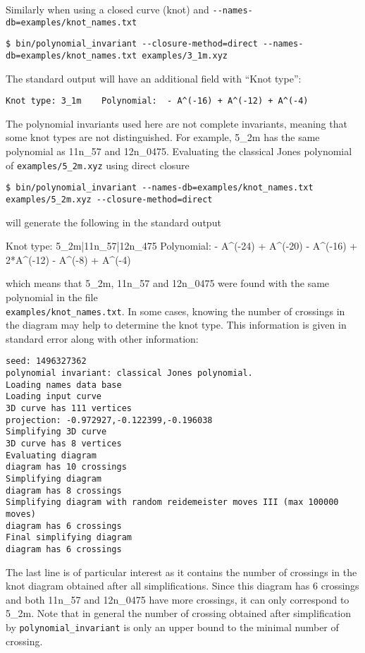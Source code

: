 Similarly when using a closed curve (knot) and \lstinline{--names-db=examples/knot_names.txt}
\begin{lstlisting}
$ bin/polynomial_invariant --closure-method=direct --names-db=examples/knot_names.txt examples/3_1m.xyz
\end{lstlisting}
The standard output will have an additional field with ``Knot type'':
\begin{lstlisting}
Knot type: 3_1m    Polynomial:  - A^(-16) + A^(-12) + A^(-4)
\end{lstlisting}


The polynomial invariants used here are not complete invariants, meaning that some knot types are not distinguished. For example, 5\_2m has the same polynomial as 11n\_57 and 12n\_0475. Evaluating the classical Jones polynomial of \lstinline{examples/5_2m.xyz} using direct closure 
\begin{lstlisting}
$ bin/polynomial_invariant --names-db=examples/knot_names.txt examples/5_2m.xyz --closure-method=direct
\end{lstlisting}
will generate the following in the standard output
\begin{lstlistingsmall}
Knot type: 5_2m|11n_57|12n_475  Polynomial:  - A^(-24) + A^(-20) - A^(-16) + 2*A^(-12) - A^(-8) + A^(-4)
\end{lstlistingsmall}
which means that 5\_2m, 11n\_57 and 12n\_0475 were found with the same polynomial in the file\\
\lstinline{examples/knot_names.txt}. In some cases, knowing the number of crossings in the diagram may help to determine the knot type. This information is given in standard error along with other information:
\begin{lstlisting}
seed: 1496327362
polynomial invariant: classical Jones polynomial.
Loading names data base
Loading input curve
3D curve has 111 vertices
projection: -0.972927,-0.122399,-0.196038
Simplifying 3D curve
3D curve has 8 vertices
Evaluating diagram
diagram has 10 crossings
Simplifying diagram
diagram has 8 crossings
Simplifying diagram with random reidemeister moves III (max 100000 moves)
diagram has 6 crossings
Final simplifying diagram
diagram has 6 crossings
\end{lstlisting}
The last line is of particular interest as it contains the number of crossings in the knot diagram obtained after all simplifications. Since this diagram has 6 crossings and both 11n\_57 and 12n\_0475 have more crossings, it can only correspond to 5\_2m. Note that in general the number of crossing obtained after simplification by \lstinline{polynomial_invariant} is only an upper bound to the minimal number of crossing.

